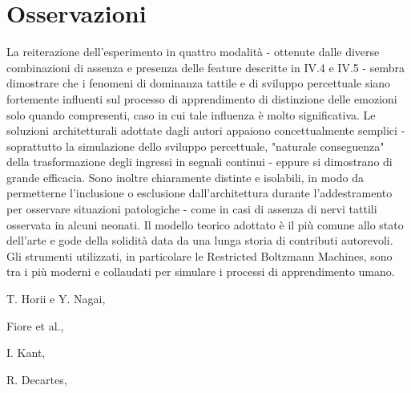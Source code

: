 \documentclass[10pt,letterpaper]{article}
\begin{document}
\section{Osservazioni}
La reiterazione dell'esperimento in quattro modalità - ottenute dalle diverse combinazioni di assenza e presenza delle feature descritte in IV.4 e IV.5 - sembra dimostrare che i fenomeni di dominanza tattile e di sviluppo percettuale siano fortemente influenti sul processo di apprendimento di distinzione delle emozioni solo quando compresenti, caso in cui tale influenza è molto significativa. Le soluzioni architetturali adottate dagli autori appaiono concettualmente semplici - soprattutto la simulazione dello sviluppo percettuale, "naturale conseguenza" della trasformazione degli ingressi in segnali continui - eppure si dimostrano di grande efficacia. Sono inoltre chiaramente distinte e isolabili, in modo da permetterne l'inclusione o esclusione dall'architettura durante l'addestramento per osservare situazioni patologiche - come in casi di assenza di nervi tattili osservata in alcuni neonati. Il modello teorico adottato è il più comune allo stato dell'arte e gode della solidità data da una lunga storia di contributi autorevoli. Gli strumenti utilizzati, in particolare le Restricted Boltzmann Machines, sono tra i più moderni e collaudati per simulare i processi di apprendimento umano.

\nolinenumbers

\newpage
\begin{thebibliography}{2}

T. Horii e Y. Nagai,

Fiore et al.,

I. Kant,

R. Decartes,

\end{thebibliography}
\end{document}
